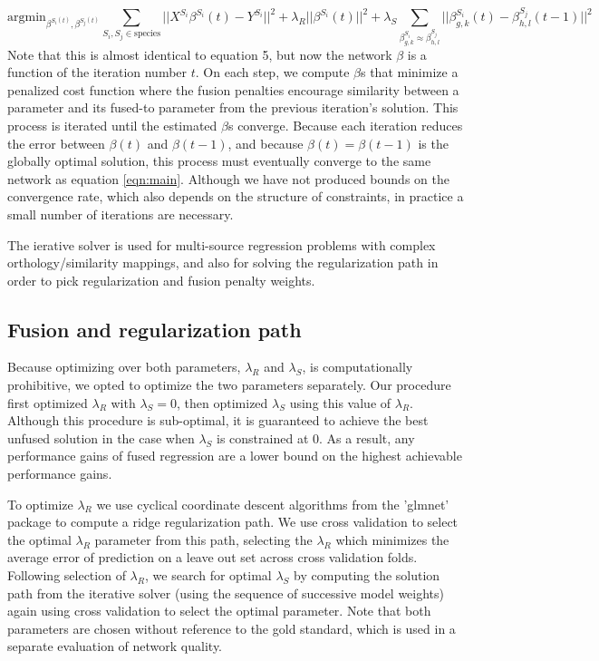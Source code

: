 \documentclass[11pt]{article}
\begin{document}
\begin{equation}
\text{argmin}_{\beta^{S_i(t)}, \beta^{S_j(t)}} \displaystyle\sum_{S_i, S_j \in \text{species}} ||X^{S_i}\beta^{S_i}(t) - Y^{S_i}||^2 + \lambda_R||\beta^{S_i}(t)||^2 + \lambda_S\displaystyle \sum_{\beta_{g,k}^{S_i} \approx \beta_{h,l}^{S_j}} ||\beta^{S_i}_{g,k}(t) - \beta_{h,l}^{S_j}(t-1)||^2
\end{equation}
Note that this is almost identical to equation 5, but now the network $\beta$ is a function of the iteration number $t$. On each step, we compute $\beta$s that minimize a penalized cost function where the fusion penalties encourage similarity between a parameter and its fused-to parameter from the previous iteration's solution. This process is iterated until the estimated $\beta$s converge. Because each iteration reduces the error between $\beta(t)$ and $\beta(t-1)$, and because $\beta(t) = \beta(t-1)$ is the globally optimal solution, this process must eventually converge to the same network as equation \ref{eqn:main}. Although we have not produced bounds on the convergence rate, which also depends on the structure of constraints, in practice a small number of iterations are necessary.

The ierative solver is used for multi-source regression problems with complex orthology/similarity mappings, and also for solving the regularization path in order to pick regularization and fusion penalty weights. 

\subsection{Fusion and regularization path}
Because optimizing over both parameters, $\lambda_R$ and $\lambda_S$, is computationally prohibitive, we opted to optimize the two parameters separately. Our procedure first optimized $\lambda_R$ with $\lambda_S=0$, then optimized $\lambda_S$ using this value of $\lambda_R$. Although this procedure is sub-optimal, it is guaranteed to achieve the best unfused solution in the case when $\lambda_S$ is constrained at 0. As a result, any performance gains of fused regression are a lower bound on the highest achievable performance gains. 

To optimize $\lambda_R$ we use cyclical coordinate descent algorithms from the 'glmnet' package \cite{friedman_regularization_2010} to compute a ridge regularization path. We use cross validation to select the optimal $\lambda_R$ parameter from this path, selecting the $\lambda_R$ which minimizes the average error of prediction on a leave out set across cross validation folds. Following selection of $\lambda_R$, we search for optimal $\lambda_S$ by computing the solution path from the iterative solver (using the sequence of successive model weights) again using cross validation to select the optimal parameter. Note that both parameters are chosen without reference to the gold standard, which is used in a separate evaluation of network quality. 
\end{document}
